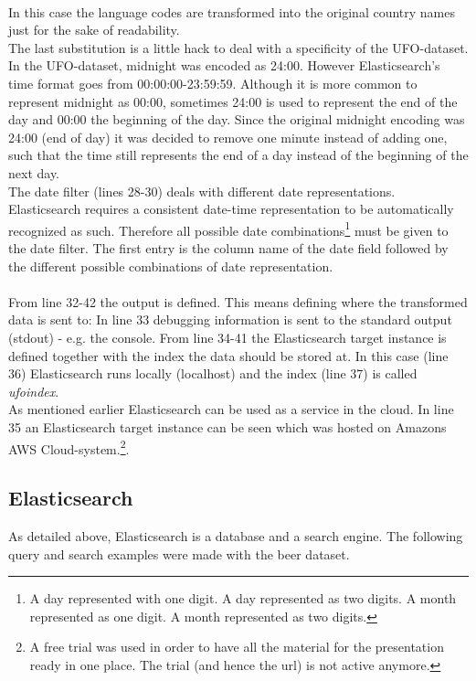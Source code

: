 \documentclass[bibliography=totoc]{article}
\begin{document}
\\
In this case the language codes are transformed into the original country names
just for the sake of readability.
\\
The last substitution is a little hack to deal with a specificity of the UFO-dataset.
In the UFO-dataset, midnight was encoded as 24:00. However Elasticsearch's time format goes from
00:00:00-23:59:59. Although it is more common to represent midnight as 00:00, sometimes
24:00 is used to represent the end of the day and 00:00 the beginning of the day.
Since the original midnight encoding was 24:00 (end of day) it was decided to 
remove one minute instead of adding one, such that the time still represents the end 
of a day instead of the beginning of the next day.
\\
The date filter (lines 28-30) deals with different date representations.
Elasticsearch requires a consistent date-time representation to be automatically
recognized as such. Therefore all possible date combinations\footnote{A day represented with one digit. A day represented as two digits. A month represented as one digit. A month represented as two digits.} must be 
given to the date filter.
The first entry is the column name of the date field followed by the 
different possible combinations of date representation.
\\
\\
From line 32-42 the output is defined. This means defining where the transformed data is 
sent to:
In line 33 debugging information is sent to the standard output (stdout) - e.g. the console.
From line 34-41 the Elasticsearch target instance is defined together with the 
index the data should be stored at. In this case (line 36) Elasticsearch
runs locally (localhost) and the index (line 37) is called \textit{ufoindex}.
\\
As mentioned earlier Elasticsearch can be used as a service in the cloud. In line 
35 an Elasticsearch target instance can be seen which was hosted on Amazons AWS Cloud-system.\footnote{A free trial was used in order to have all the material for the presentation ready in one place. The trial (and hence the url) is not active anymore.}.

\subsection{Elasticsearch}
As detailed above, Elasticsearch is a database and a search engine.
The following query and search examples were made with the beer dataset.
\end{document}
